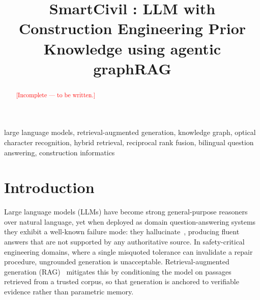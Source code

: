 \documentclass[10pt,a4paper,conference]{IEEEtran}
\begin{document}
\title{SmartCivil : LLM with Construction Engineering Prior Knowledge using agentic graphRAG\\
}

\author{
\and
{}
\and
{}
}

\maketitle

\begin{abstract}
\textcolor{red}{[Incomplete — to be written.]}
\end{abstract}

\begin{IEEEkeywords}
large language models, retrieval-augmented generation, knowledge graph,
optical character recognition, hybrid retrieval, reciprocal rank fusion,
bilingual question answering, construction informatics
\end{IEEEkeywords}

\section{Introduction}
Large language models (LLMs) have become strong general-purpose reasoners over
natural language, yet when deployed as domain question-answering systems they
exhibit a well-known failure mode: they hallucinate~\cite{halluc}, producing
fluent answers that are not supported by any authoritative source. In safety-critical
engineering domains, where a single misquoted tolerance can invalidate a repair
procedure, ungrounded generation is unacceptable. Retrieval-augmented
generation (RAG)~\cite{rag} mitigates this by conditioning the model on passages
retrieved from a trusted corpus, so that generation is anchored to verifiable
evidence rather than parametric memory.
\end{document}
